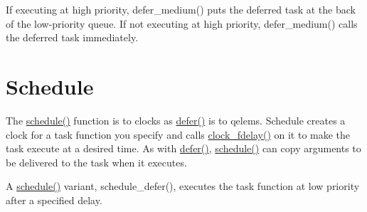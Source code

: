 If executing at high priority, defer\_\-medium() puts the deferred task at the back of the low-\/priority queue. If not executing at high priority, defer\_\-medium() calls the deferred task immediately.\hypertarget{chapter_scheduler_chapter_scheduler_sechedule}{}\section{Schedule}\label{chapter_scheduler_chapter_scheduler_sechedule}
The \hyperlink{group__threading_ga1eb8ec7623f0806dd079d7be708c19a8}{schedule()} function is to clocks as \hyperlink{group__threading_gaa24a0c9896f1ad241e45590065c3f643}{defer()} is to qelems. Schedule creates a clock for a task function you specify and calls \hyperlink{group__clocks_ga61719f0e0379fffbe79ae2bd5699b66f}{clock\_\-fdelay()} on it to make the task execute at a desired time. As with \hyperlink{group__threading_gaa24a0c9896f1ad241e45590065c3f643}{defer()}, \hyperlink{group__threading_ga1eb8ec7623f0806dd079d7be708c19a8}{schedule()} can copy arguments to be delivered to the task when it executes.

A \hyperlink{group__threading_ga1eb8ec7623f0806dd079d7be708c19a8}{schedule()} variant, schedule\_\-defer(), executes the task function at low priority after a specified delay. 
